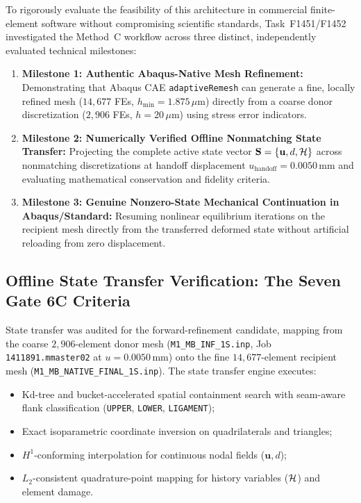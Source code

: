 To rigorously evaluate the feasibility of this architecture in commercial finite-element software without compromising scientific standards, Task~F1451/F1452 investigated the Method~C workflow across three distinct, independently evaluated technical milestones:
\begin{enumerate}
  \item \textbf{Milestone 1: Authentic Abaqus-Native Mesh Refinement:} Demonstrating that Abaqus CAE \texttt{adaptiveRemesh} can generate a fine, locally refined mesh ($14{,}677$ FEs, $h_{\min} = 1.875\,\mu\mathrm{m}$) directly from a coarse donor discretization ($2{,}906$ FEs, $h = 20\,\mu\mathrm{m}$) using stress error indicators.
  \item \textbf{Milestone 2: Numerically Verified Offline Nonmatching State Transfer:} Projecting the complete active state vector $\mathbf{S} = \{\mathbf{u}, d, \mathcal{H}\}$ across nonmatching discretizations at handoff displacement $u_{\mathrm{handoff}} = 0.0050\,\mathrm{mm}$ and evaluating mathematical conservation and fidelity criteria.
  \item \textbf{Milestone 3: Genuine Nonzero-State Mechanical Continuation in Abaqus/Standard:} Resuming nonlinear equilibrium iterations on the recipient mesh directly from the transferred deformed state without artificial reloading from zero displacement.
\end{enumerate}

\subsection{Offline State Transfer Verification: The Seven Gate 6C Criteria}
\label{subsec:method_c_offline_transfer_criteria}

State transfer was audited for the forward-refinement candidate, mapping from the coarse $2{,}906$-element donor mesh (\texttt{M1\_MB\_INF\_1S.inp}, Job \texttt{1411891.mmaster02} at $u = 0.0050\,\mathrm{mm}$) onto the fine $14{,}677$-element recipient mesh (\texttt{M1\_MB\_NATIVE\_FINAL\_1S.inp}). The state transfer engine executes:
\begin{itemize}
  \item Kd-tree and bucket-accelerated spatial containment search with seam-aware flank classification (\texttt{UPPER}, \texttt{LOWER}, \texttt{LIGAMENT});
  \item Exact isoparametric coordinate inversion on quadrilaterals and triangles;
  \item $H^1$-conforming interpolation for continuous nodal fields ($\mathbf{u}, d$);
  \item $L_2$-consistent quadrature-point mapping for history variables ($\mathcal{H}$) and element damage.
\end{itemize}

